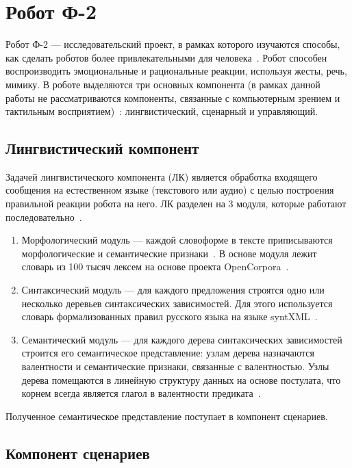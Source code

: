 \section{Робот Ф-2}\label{F2arch}

Робот Ф-2 --- исследовательский проект, в рамках которого изучаются способы, как сделать роботов более привлекательными для человека~\cite{f2_robot}.
Робот способен воспроизводить эмоциональные и рациональные реакции, используя жесты, речь, мимику.
В роботе выделяются три основных компонента (в рамках данной работы не рассматриваются компоненты, связанные с компьютерным зрением и тактильным восприятием)~\cite{kotov_f2_architecture}: лингвистический, сценарный и управляющий.

\subsection{Лингвистический компонент}

Задачей лингвистического компонента (ЛК) является обработка входящего сообщения на естественном языке (текстового или аудио) с целью построения правильной реакции робота на него.
ЛК разделен на 3 модуля, которые работают последовательно~\cite{kotov_f2_architecture}.

\begin{enumerate}
	\item Морфологический модуль --- каждой словоформе в тексте приписываются морфологические и семантические признаки~\cite{zaydelman2018_f2_text}. 
	В основе модуля лежит словарь из 100 тысяч лексем на основе проекта OpenCorpora~\cite{open_coprora}.
	\item Синтаксический модуль --- для каждого предложения строятся одно или несколько деревьев синтаксических зависимостей. 
	Для этого используется словарь формализованных правил русского языка на языке syntXML~\cite{kotov2020_f2_architecture}.
	\item Семантический модуль --- для каждого дерева синтаксических зависимостей строится его семантическое представление: узлам дерева назначаются валентности и семантические признаки, связанные с валентностью. Узлы дерева помещаются в линейную структуру данных на основе постулата, что корнем всегда является глагол в валентности предиката~\cite{kotov2020_f2_architecture}.
\end{enumerate}

Полученное семантическое представление поступает в компонент сценариев.

\subsection{Компонент сценариев}

